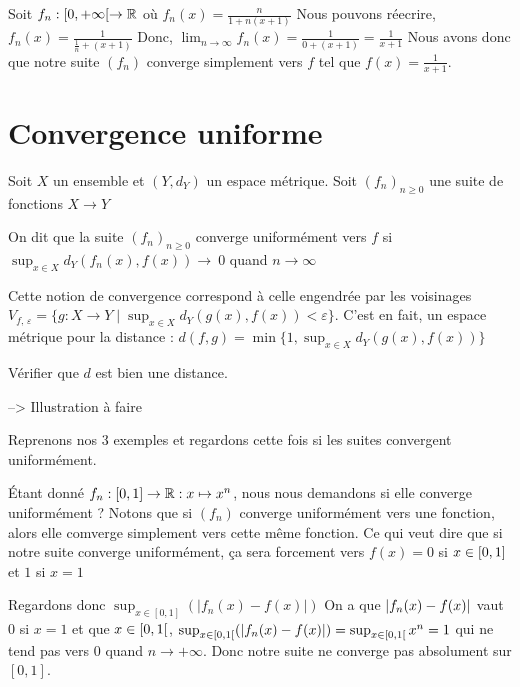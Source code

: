     \begin{exemple}
        Soit $f_n : [0,+\infty[ \to \mathbb{R}$ où $f_n(x) = \frac{n}{1+n(x+1)}$
        Nous pouvons réecrire, $f_n(x) = \frac{1}{\frac{1}{n} +(x+1)}$
        Donc, $\lim_{n\to \infty} f_n(x) = \frac{1}{0+(x+1)} =\frac{1}{x+1}$
        Nous avons donc que notre suite $(f_n)$ converge simplement vers 
        $f$ tel que $f(x) = \frac{1}{x+1}$.
    \end{exemple}
\section{Convergence uniforme}
    \begin{definition}
        Soit $X$ un ensemble et $(Y,d_Y)$ un espace métrique.
        Soit $(f_n)_{n\ge0}$ une suite de fonctions $X \to Y$

        On dit que la suite $(f_n)_{n\ge0}$ converge uniformément vers $f$ si 
        $\sup_{x\in X} d_Y(f_n(x),f(x)) \to \ 0$ quand $n\to \infty$
    \end{definition}

    Cette notion de convergence correspond à celle engendrée par les voisinages 
    $V_{f, \,\varepsilon} = \{g : X \to Y \;|\; \sup_{x\in X}d_Y(g(x),f(x)) < \varepsilon \}$.
    C'est en fait, un espace métrique pour la distance : 
    $d(f,g) = \min\{1,\sup_{x\in X}d_Y(g(x),f(x))\}$ 
    
\begin{exercice}
    Vérifier que $d$ est bien une distance.
\end{exercice}

    --> Illustration à faire 


    Reprenons nos 3 exemples et regardons cette fois si les suites convergent uniformément.

    \begin{exemple}
        Étant donné $f_n : [0,1] \to \mathbb{R} : x\mapsto x^n$, nous nous demandons si elle converge uniformément ? 
        Notons que si $(f_n)$ converge uniformément vers une fonction, alors elle comverge simplement vers cette même fonction. Ce qui veut dire que si notre suite converge uniformément, ça sera forcement vers 
        $f(x) = 0$ si $x \in \left[ 0,1\right]$ et $1$ si $x = 1$

        Regardons donc $\sup_{x\in [0,1]}(|f_n(x) - f(x)|)$
        On a que $\left| f_n(x)-f(x) \right|$ vaut $0$ si $x = 1$ et que $x \in \left[ 0,1\right[$, 
        $\sup_{x\in\left[ 0,1\right[}(|f_n(x) - f(x)|) = \sup_{x\in \left[ 0,1\right[} x^n = 1$ qui ne tend pas vers $0$  quand $n \to +\infty$. Donc notre suite ne converge pas absolument sur $[0,1]$.
        
    \end{exemple}

